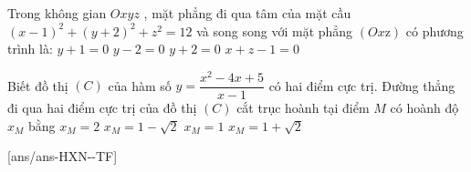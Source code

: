 \begin{ex}%
    Trong không gian $Oxyz$ , mặt phẳng đi qua tâm của mặt cầu $\left(x-1\right)^2+\left(y+2\right)^2+z^2=12$ và song song với mặt phẳng $\left(Ox\text{z}\right)$ có phương trình là:
    \choice
    {$y+1=0$}
    {$y-2=0$}
    {\True $y+2=0$}
    {$x+z-1=0$}
\end{ex}

\begin{ex}%
    Biết đồ thị $(C)$ của hàm số $y=\dfrac{x^2-4x+5}{x-1}$ có hai điểm cực trị. Đường thẳng đi qua hai điểm cực trị của đồ thị $(C)$ cắt trục hoành tại điểm $M$ có hoành độ $x_M$ bằng
    \choice
    {\True $x_M=2$}
    {$x_M=1-\sqrt{2}$}
    {$x_M=1$}
    {$x_M=1+\sqrt{2}$}
        \end{ex}
\cauds
{}[ans/ans-HXN-\sode-TF]

